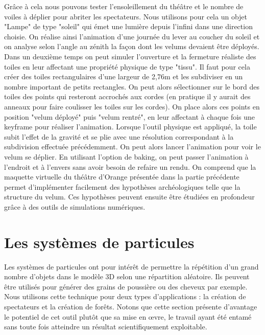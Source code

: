 Grâce à cela nous pouvons tester l'ensoleillement du théâtre et le nombre de voiles à déplier pour abriter les spectateurs. Nous utilisons pour cela un objet "Lampe" de type "soleil" qui émet une lumière depuis l'infini dans une direction choisie. On réalise ainsi l'animation d'une journée du lever au coucher du soleil et on analyse selon l'angle au zénith la façon dont les \glspl{velum} devaient être déployés. Dans un deuxième temps on peut simuler l'ouverture et la fermeture réaliste des toiles en leur affectant une propriété physique de type "tissu". Il faut pour cela créer des toiles rectangulaires d'une largeur de 2,76m et les subdiviser en un nombre important de petits rectangles. On peut alors sélectionner sur le bord des toiles des points qui resteront accrochés aux cordes (en pratique il y aurait des anneaux pour faire coulisser les toiles sur les cordes). On place alors ces points en position "\gls{velum} déployé" puis "\gls{velum} rentré", en leur affectant à chaque fois une \gls{keyframe} pour réaliser l'animation. Lorsque l'outil physique est appliqué, la toile subit l'effet de la gravité et se plie avec une résolution correspondant à la subdivision effectuée précédemment. On peut alors lancer l'animation pour voir le \gls{velum} se déplier. En utilisant l'option de \gls{baking}, on peut passer l'animation à l'endroit et à l'envers sans avoir besoin de refaire un rendu. On comprend que la maquette virtuelle du théâtre d'Orange présentée dans la partie précédente permet d'implémenter facilement des hypothèses archéologiques telle que la structure du \gls{velum}. Ces hypothèses peuvent ensuite être étudiées en profondeur grâce à des outils de simulations numériques.



\section{Les systèmes de \glspl{particule}}
Les systèmes de \glspl{particule} ont pour intérêt de permettre la répétition d'un grand nombre d'objets dans le modèle 3D selon une répartition aléatoire. Ils peuvent être utilisés pour générer des grains de poussière ou des cheveux par exemple. Nous utilisons cette technique pour deux types d'applications : la création de spectateurs et la création de forêts. Notons que cette section présente d'avantage le potentiel de cet outil plutôt que sa mise en \oe{}vre, le travail ayant été entamé sans toute fois atteindre un résultat scientifiquement exploitable.

